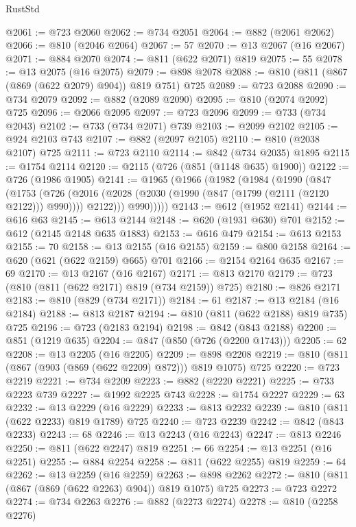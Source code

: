 \begin{lexlean}{RustStd}
\begin{coremodule}
@2061 := @723 @2060
@2062 := @734 @2051
@2064 := @882 (@2061 @2062)
@2066 := @810 (@2046 @2064)
@2067 := 57
@2070 := @13 @2067 (@16 @2067)
@2071 := @884 @2070
@2074 := @811 (@622 @2071) @819
@2075 := 55
@2078 := @13 @2075 (@16 @2075)
@2079 := @898 @2078
@2088 := @810 (@811 (@867 (@869 (@622 @2079) @904)) @819 @751) @725
@2089 := @723 @2088
@2090 := @734 @2079
@2092 := @882 (@2089 @2090)
@2095 := @810 (@2074 @2092) @725
@2096 := @2066 @2095
@2097 := @723 @2096
@2099 := @733 (@734 @2043)
@2102 := @733 (@734 @2071) @739
@2103 := @2099 @2102
@2105 := @924 @2103 @743
@2107 := @882 (@2097 @2105)
@2110 := @810 (@2038 @2107) @725
@2111 := @723 @2110
@2114 := @842 (@734 @2035) @1895
@2115 := @1754 @2114
@2120 := @2115 (@726 (@851 (@1148 @635) @1900))
@2122 := @726 (@1986 @1905)
@2141 := @1965
    (@1966
      (@1982
        (@1984
          (@1990
            (@847
              (@1753
                (@726
                  (@2016 (@2028 (@2030 (@1990 (@847 (@1799 (@2111 (@2120 @2122))) @990)))) @2122)))
              @990)))))
@2143 := @612 (@1952 @2141)
@2144 := @616 @63
@2145 := @613 @2144
@2148 := @620 (@1931 @630) @701
@2152 := @612 (@2145 @2148 @635 @1883)
@2153 := @616 @479
@2154 := @613 @2153
@2155 := 70
@2158 := @13 @2155 (@16 @2155)
@2159 := @800 @2158
@2164 := @620 (@621 (@622 @2159) @665) @701
@2166 := @2154 @2164 @635
@2167 := 69
@2170 := @13 @2167 (@16 @2167)
@2171 := @813 @2170
@2179 := @723 (@810 (@811 (@622 @2171) @819 (@734 @2159)) @725)
@2180 := @826 @2171
@2183 := @810 (@829 (@734 @2171))
@2184 := 61
@2187 := @13 @2184 (@16 @2184)
@2188 := @813 @2187
@2194 := @810 (@811 (@622 @2188) @819 @735) @725
@2196 := @723 (@2183 @2194)
@2198 := @842 (@843 @2188)
@2200 := @851 (@1219 @635)
@2204 := @847 (@850 (@726 (@2200 @1743)))
@2205 := 62
@2208 := @13 @2205 (@16 @2205)
@2209 := @898 @2208
@2219 := @810 (@811 (@867 (@903 (@869 (@622 @2209) @872))) @819 @1075) @725
@2220 := @723 @2219
@2221 := @734 @2209
@2223 := @882 (@2220 @2221)
@2225 := @733 @2223 @739
@2227 := @1992 @2225 @743
@2228 := @1754 @2227
@2229 := 63
@2232 := @13 @2229 (@16 @2229)
@2233 := @813 @2232
@2239 := @810 (@811 (@622 @2233) @819 @1789) @725
@2240 := @723 @2239
@2242 := @842 (@843 @2233)
@2243 := 68
@2246 := @13 @2243 (@16 @2243)
@2247 := @813 @2246
@2250 := @811 (@622 @2247) @819
@2251 := 66
@2254 := @13 @2251 (@16 @2251)
@2255 := @884 @2254
@2258 := @811 (@622 @2255) @819
@2259 := 64
@2262 := @13 @2259 (@16 @2259)
@2263 := @898 @2262
@2272 := @810 (@811 (@867 (@869 (@622 @2263) @904)) @819 @1075) @725
@2273 := @723 @2272
@2274 := @734 @2263
@2276 := @882 (@2273 @2274)
@2278 := @810 (@2258 @2276)

\end{coremodule}
\end{lexlean}
